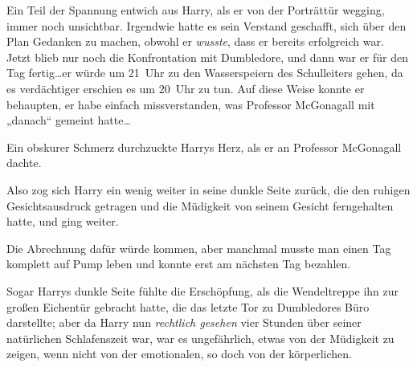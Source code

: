 Ein Teil der Spannung entwich aus Harry, als er von der Porträttür wegging, immer noch unsichtbar. Irgendwie hatte es sein Verstand geschafft, sich über den Plan Gedanken zu machen, obwohl er \emph{wusste}, dass er bereits erfolgreich war. Jetzt blieb nur noch die Konfrontation mit Dumbledore, und dann war er für den Tag fertig…er würde um 21~Uhr zu den Wasserspeiern des Schulleiters gehen, da es verdächtiger erschien es um 20~Uhr zu tun. Auf diese Weise konnte er behaupten, er habe einfach missverstanden, was Professor McGonagall mit „danach“ gemeint hatte…

Ein obskurer Schmerz durchzuckte Harrys Herz, als er an Professor McGonagall dachte.

Also zog sich Harry ein wenig weiter in seine dunkle Seite zurück, die den ruhigen Gesichtsausdruck getragen und die Müdigkeit von seinem Gesicht ferngehalten hatte, und ging weiter.

Die Abrechnung dafür würde kommen, aber manchmal musste man einen Tag komplett auf Pump leben und konnte erst am nächsten Tag bezahlen.

\later

Sogar Harrys dunkle Seite fühlte die Erschöpfung, als die Wendeltreppe ihn zur großen Eichentür gebracht hatte, die das letzte Tor zu Dumbledores Büro darstellte; aber da Harry nun \emph{rechtlich gesehen} vier Stunden über seiner natürlichen Schlafenszeit war, war es ungefährlich, etwas von der Müdigkeit zu zeigen, wenn nicht von der emotionalen, so doch von der körperlichen.

